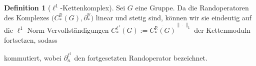 \documentclass[a4paper,twoside,10pt]{scrreprt}
\newcommand{\R}{\mathbb{R}}
\theoremstyle{definition}
\newtheorem{definition}[satz]{Definition}
\begin{document}
\begin{definition}[$\ell^1$-Kettenkomplex]\label{def:Ell1ChainComplex}
Sei $G$ eine Gruppe. Da die Randoperatoren des Komplexes $\bigl(C_*^{\R}(G),\partial_*^{\R}\bigr)$ linear und stetig sind, können wir sie eindeutig auf die $\ell^1$-Norm-Vervollständigungen $C_*^{\ell^1}(G):=\overline{C_*^{\R}(G)}^{\|\cdot\|_1}$  der Kettenmoduln fortsetzen, sodass 
\begin{center}
\end{center}
kommutiert, wobei $\partial_n^{\ell^1}$ den fortgesetzten Randoperator bezeichnet.
\end{definition}
\end{document}
